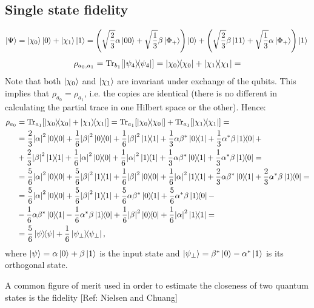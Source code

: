 \documentclass[11p]{article}
\begin{document}
\subsection{Single state fidelity}
\[
    \ket{\Psi}=\ket{\chi_0}\ket{0}+\ket{\chi_1}\ket{1}=\left(\sqrt{\frac{2}{3}}\alpha\ket{00}+\sqrt{\frac{1}{3}}\beta\ket{\Phi_+}\right)\ket{0}+\left(\sqrt{\frac{2}{3}}\beta\ket{11}+\sqrt{\frac{1}{3}}\alpha\ket{\Phi_+}\right)\ket{1}\\
\]
\[
    \rho_{a_0,a_1}=\Tr_{b_1}[\ketbra{\psi_4}{\psi_4}]=\ketbra{\chi_0}{\chi_0}+\ketbra{\chi_1}{\chi_1}=
\]
Note that both $\ket{\chi_0}$ and $\ket{\chi_1}$ are invariant under exchange of the qubits. This implies that $\rho_{a_0}=\rho_{a_1}$, i.e. the copies are identical (there is no different in calculating the partial trace in one Hilbert space or the other). Hence:
\[
    \begin{split}
    \rho_{a_0}&=\Tr_{a_1}[\ketbra{\chi_0}{\chi_0}+\ketbra{\chi_1}{\chi_1}]=\Tr_{a_1}[\ketbra{\chi_0}{\chi_0}]+\Tr_{a_1}[\ketbra{\chi_1}{\chi_1}]=\\
    &=\frac{2}{3}\abs{\alpha}^2\ketbra{0}{0}+\frac{1}{6}\abs{\beta}^2\ketbra{0}{0}+\frac{1}{6}\abs{\beta}^2\ketbra{1}{1}+\frac{1}{3}\alpha\beta^*\ketbra{0}{1}+\frac{1}{3}\alpha^*\beta\ketbra{1}{0}+\\
    &+\frac{2}{3}\abs{\beta}^2\ketbra{1}{1}+\frac{1}{6}\abs{\alpha}^2\ketbra{0}{0}+\frac{1}{6}\abs{\alpha}^2\ketbra{1}{1}+\frac{1}{3}\alpha\beta^*\ketbra{0}{1}+\frac{1}{3}\alpha^*\beta\ketbra{1}{0}=\\
    &=\frac{5}{6}\abs{\alpha}^2\ketbra{0}{0}+\frac{5}{6}\abs{\beta}^2\ketbra{1}{1}+\frac{1}{6}\abs{\beta}^2\ketbra{0}{0}+\frac{1}{6}\abs{\alpha}^2\ketbra{1}{1}+\frac{2}{3}\alpha\beta^*\ketbra{0}{1}+\frac{2}{3}\alpha^*\beta\ketbra{1}{0}=\\
    &=\frac{5}{6}\abs{\alpha}^2\ketbra{0}{0}+\frac{5}{6}\abs{\beta}^2\ketbra{1}{1}+\frac{5}{6}\alpha\beta^*\ketbra{0}{1}+\frac{5}{6}\alpha^*\beta\ketbra{1}{0}-\\
    &-\frac{1}{6}\alpha\beta^*\ketbra{0}{1}-\frac{1}{6}\alpha^*\beta\ketbra{1}{0}+\frac{1}{6}\abs{\beta}^2\ketbra{0}{0}+\frac{1}{6}\abs{\alpha}^2\ketbra{1}{1}=\\
    &=\frac{5}{6}\ketbra{\psi}{\psi}+\frac{1}{6}\ketbra{\psi_{\perp}}{\psi_{\perp}},
    \end{split}
\]
where $\ket{\psi}=\alpha\ket{0}+\beta\ket{1}$ is the input state and $\ket{\psi_{\perp}}=\beta^*\ket{0}-\alpha^*\ket{1}$ is its orthogonal state.

A common figure of merit used in order to estimate the closeness of two quantum states is the fidelity [Ref: Nielsen and Chuang]
\end{document}
